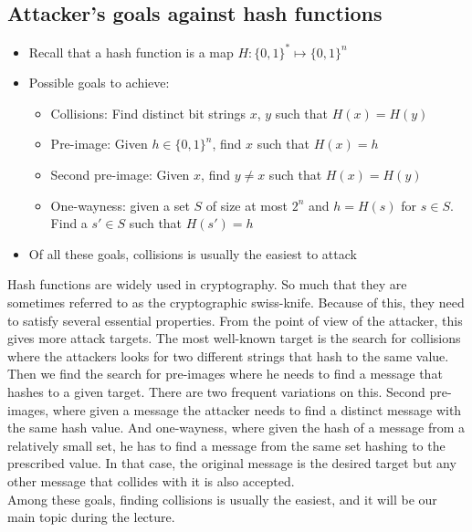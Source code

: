 	\subsection{Attacker’s goals against hash functions}
		\begin{itemize}
			\item Recall that a hash function is a map $H: \{0,1\}^* \mapsto \{0,1\}^n$
			\item Possible goals to achieve:
			\begin{itemize}
				\item Collisions: Find distinct bit strings $x$, $y$ such that $H(x)=H(y)$
				\item Pre-image: Given $h \in \{0,1\}^n$, find $x$ such that $H(x)=h$
				\item Second pre-image: Given $x$, find $y \neq x$ such that $H(x) = H(y)$
				\item One-wayness: given a set $S$ of size at most $2^n$ and $h=H(s)$ for $s \in S$.
				Find a $s' \in S$ such that $H(s')=h$
			\end{itemize}
			\item Of all these goals, collisions is usually the easiest to attack
		\end{itemize}
		Hash functions are widely used in cryptography. 
		So much that they are sometimes referred to as the cryptographic swiss-knife. 
		Because of this, they need to satisfy several essential properties. 
		From the point of view of the attacker, this gives more attack targets. 
		The most well-known target is the search for collisions where the attackers looks for two different strings that hash to the same value. 
		Then we find the search for pre-images where he needs to find a message that hashes to a given target. 
		There are two frequent variations on this. 
		Second pre-images, where given a message the attacker needs to find a distinct message with the same hash value. 
		And one-wayness, where given the hash of a message from a relatively small set, he has to find a message from the same set hashing to the prescribed value. 
		In that case, the original message is the desired target but any other message that collides with it is also accepted.\\
		Among these goals, finding collisions is usually the easiest, and it will be our main topic during the lecture.
	
